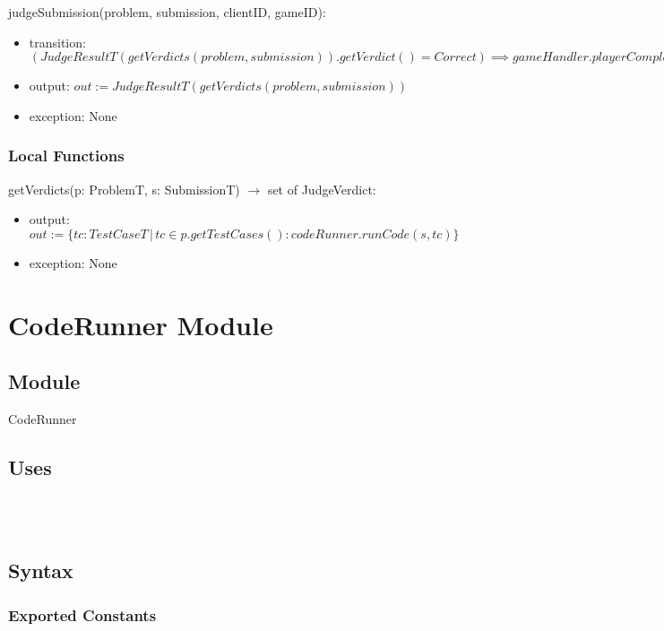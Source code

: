 \documentclass[12pt, titlepage]{article}
\begin{document}
\noindent judgeSubmission(problem, submission, clientID, gameID):
\begin{itemize}
\item transition: $(JudgeResultT(getVerdicts(problem, submission)).getVerdict() = Correct) \implies gameHandler.playerCompleteRound(clientID, gameID)$
\item output:  $out := JudgeResultT(getVerdicts(problem, submission))$
\item exception: None
\end{itemize}

\subsubsection{Local Functions}
\noindent getVerdicts(p: ProblemT, s: SubmissionT) $\rightarrow$ set of JudgeVerdict:
\begin{itemize}
\item output: $out := \{ tc: TestCaseT \, | \, tc \in p.getTestCases() : codeRunner.runCode(s, tc )\}$
\item exception: None
\end{itemize}

\newpage

\section{CodeRunner Module} \label{CodeRunner} 

\subsection{Module}

CodeRunner

\subsection{Uses}

\\
\\

\subsection{Syntax}

\subsubsection{Exported Constants}
\end{document}
